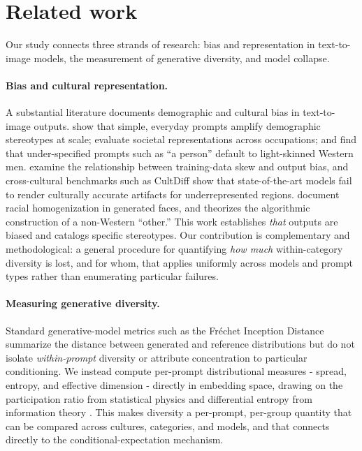 \documentclass[11pt]{article}
\begin{document}
\section{Related work}\label{sec:related}

Our study connects three strands of research: bias and representation in text-to-image models, the measurement of generative diversity, and model collapse.

\paragraph{Bias and cultural representation.} A substantial literature documents demographic and cultural bias in text-to-image outputs. \citet{Bianchi2023} show that simple, everyday prompts amplify demographic stereotypes at scale; \citet{Luccioni2023} evaluate societal representations across occupations; and \citet{Ghosh2023} find that under-specified prompts such as ``a person'' default to light-skinned Western men. \citet{Seshadri2023} examine the relationship between training-data skew and output bias, and cross-cultural benchmarks such as CultDiff \citep{Bayramli2025} show that state-of-the-art models fail to render culturally accurate artifacts for underrepresented regions. \citet{AlDahoul2025} document racial homogenization in generated faces, and \citet{Kotliar2020} theorizes the algorithmic construction of a non-Western ``other.'' This work establishes \emph{that} outputs are biased and catalogs specific stereotypes. Our contribution is complementary and methodological: a general procedure for quantifying \emph{how much} within-category diversity is lost, and for whom, that applies uniformly across models and prompt types rather than enumerating particular failures.

\paragraph{Measuring generative diversity.} Standard generative-model metrics such as the Fr\'echet Inception Distance summarize the distance between generated and reference distributions but do not isolate \emph{within-prompt} diversity or attribute concentration to particular conditioning. We instead compute per-prompt distributional measures - spread, entropy, and effective dimension - directly in embedding space, drawing on the participation ratio from statistical physics and differential entropy from information theory \citep{Shannon1948}. This makes diversity a per-prompt, per-group quantity that can be compared across cultures, categories, and models, and that connects directly to the conditional-expectation mechanism.
\end{document}

